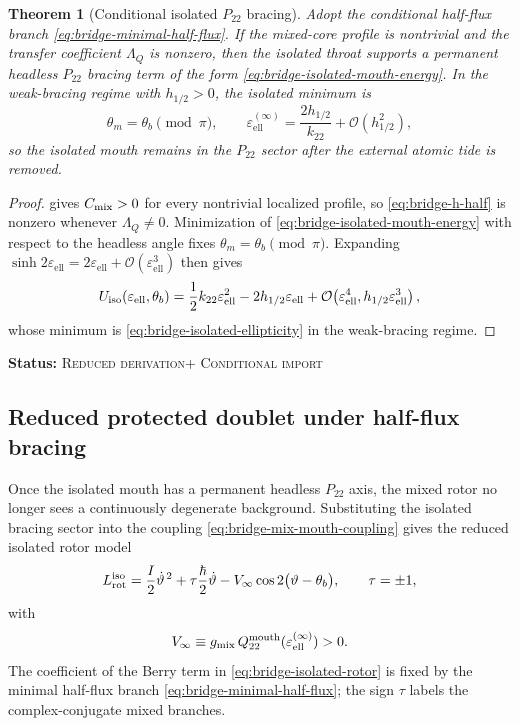 \documentclass[11pt]{article}
\theoremstyle{plain}
\newtheorem{theorem}{Theorem}[section]
\theoremstyle{definition}
\theoremstyle{remark}
\newcommand{\statusReduced}{\textsc{Reduced derivation}}
\newcommand{\statusConditional}{\textsc{Conditional import}}
\newcommand{\claimstatus}[1]{\par\smallskip\noindent\textbf{Status:} #1\par\smallskip}
\newcommand{\Ptwotwo}{P_{22}}
\newcommand{\epsell}{\varepsilon_{\mathrm{ell}}}
\newcommand{\throt}{\vartheta}
\newcommand{\thmouth}{\theta_m}
\newcommand{\Order}[1]{\mathcal{O}\!\left(#1\right)}
\begin{document}
\begin{theorem}[Conditional isolated \texorpdfstring{$\Ptwotwo$}{P22} bracing]\label{thm:bridge-isolated-bracing}
Adopt the conditional half-flux branch \cref{eq:bridge-minimal-half-flux}. If the mixed-core profile is nontrivial and the transfer coefficient \(\Lambda_Q\) is nonzero, then the isolated throat supports a permanent headless \(\Ptwotwo\) bracing term of the form \cref{eq:bridge-isolated-mouth-energy}. In the weak-bracing regime with \(h_{1/2}>0\), the isolated minimum is
\begin{equation}
\thmouth=\theta_b\pmod{\pi},
\qquad
\epsell^{(\infty)}
=
\frac{2h_{1/2}}{k_{22}}+\Order{h_{1/2}^2},
\label{eq:bridge-isolated-ellipticity}
\end{equation}
so the isolated mouth remains in the \(\Ptwotwo\) sector after the external atomic tide is removed.
\end{theorem}
\begin{proof}
 gives \(C_{\rm mix}>0\) for every nontrivial localized profile, so \cref{eq:bridge-h-half} is nonzero whenever \(\Lambda_Q\neq 0\). Minimization of \cref{eq:bridge-isolated-mouth-energy} with respect to the headless angle fixes \(\thmouth=\theta_b\pmod{\pi}\). Expanding \(\sinh 2\epsell = 2\epsell+\Order{\epsell^3}\) then gives
\[
U_{\rm iso}(\epsell,\theta_b)
=
\frac12 k_{22}\epsell^2-2h_{1/2}\epsell+\Order{\epsell^4,h_{1/2}\epsell^3},
\]
whose minimum is \cref{eq:bridge-isolated-ellipticity} in the weak-bracing regime.
\end{proof}
\claimstatus{\statusReduced + \statusConditional}

\subsection{Reduced protected doublet under half-flux bracing}\label{subsec:bridge-doublet}

Once the isolated mouth has a permanent headless \(\Ptwotwo\) axis, the mixed rotor no longer sees a continuously degenerate background. Substituting the isolated bracing sector into the coupling \cref{eq:bridge-mix-mouth-coupling} gives the reduced isolated rotor model
\begin{equation}
L_{\rm rot}^{\rm iso}
=
\frac{I}{2}\dot\throt^{\,2}
+\tau\frac{\hbar}{2}\dot\throt
-V_\infty\cos 2\bigl(\throt-\theta_b\bigr),
\qquad
\tau=\pm1,
\label{eq:bridge-isolated-rotor}
\end{equation}
with
\begin{equation}
V_\infty
\equiv
g_{\rm mix}\,Q_{22}^{\rm mouth}(\epsell^{(\infty)})>0.
\label{eq:bridge-Vinfty}
\end{equation}
The coefficient of the Berry term in \cref{eq:bridge-isolated-rotor} is fixed by the minimal half-flux branch \cref{eq:bridge-minimal-half-flux}; the sign \(\tau\) labels the complex-conjugate mixed branches.
\end{document}
